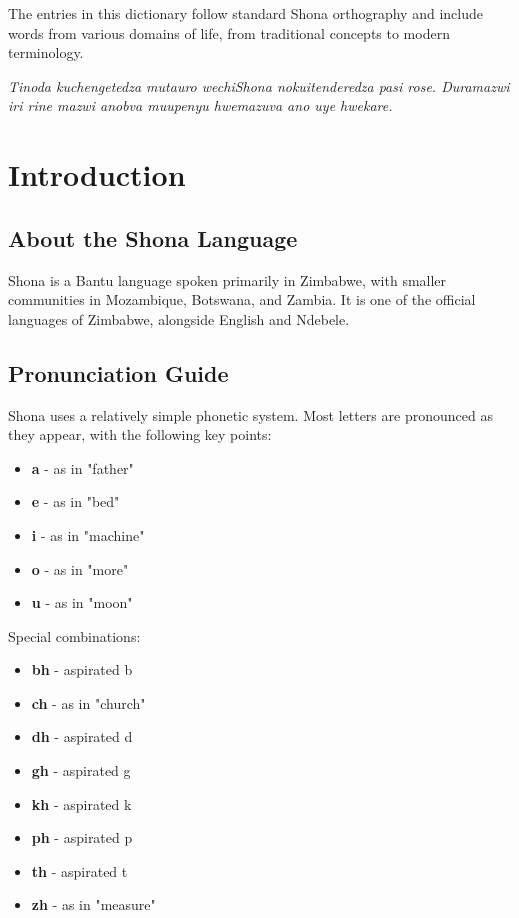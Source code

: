 \documentclass[10pt,twoside]{book}
\begin{document}
The entries in this dictionary follow standard Shona orthography and include words from various domains of life, from traditional concepts to modern terminology.

\vspace{1cm}
\textit{Tinoda kuchengetedza mutauro wechiShona nokuitenderedza pasi rose. Duramazwi iri rine mazwi anobva muupenyu hwemazuva ano uye hwekare.}

\chapter*{Introduction}

\section*{About the Shona Language}

Shona is a Bantu language spoken primarily in Zimbabwe, with smaller communities in Mozambique, Botswana, and Zambia. It is one of the official languages of Zimbabwe, alongside English and Ndebele.

\section*{Pronunciation Guide}

Shona uses a relatively simple phonetic system. Most letters are pronounced as they appear, with the following key points:

\begin{itemize}
\item \textbf{a} - as in "father"
\item \textbf{e} - as in "bed"
\item \textbf{i} - as in "machine"
\item \textbf{o} - as in "more"
\item \textbf{u} - as in "moon"
\end{itemize}

Special combinations:
\begin{itemize}
\item \textbf{bh} - aspirated b
\item \textbf{ch} - as in "church"
\item \textbf{dh} - aspirated d
\item \textbf{gh} - aspirated g
\item \textbf{kh} - aspirated k
\item \textbf{ph} - aspirated p
\item \textbf{th} - aspirated t
\item \textbf{zh} - as in "measure"
\end{itemize}
\end{document}
